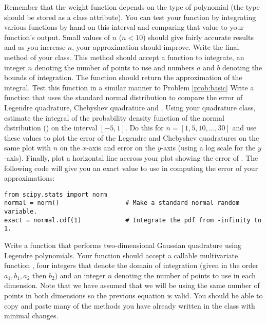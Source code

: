 Remember that the weight function depends on the type of polynomial (the type should be stored as a class attribute).
You can test your function by integrating various functions by hand on this interval and comparing that value to your function's output.
Small values of $n$ ($n<10$) should give fairly accurate results and as you increase $n$, your approximation should improve.
\label{prob:basic}
Write the final method of your class.
This method should accept a function  to integrate, an integer $n$ denoting the number of points to use and numbers $a$ and $b$ denoting the bounds of integration.
The function should return the approximation of the integral.
Test this function in a similar manner to Problem \ref{prob:basic}
Write a function that uses the standard normal distribution to compare the error of Legendre quadrature, Chebyshev quadrature and .
Using your quadrature class, estimate the integral of the probability density function of the normal distribution () on the interval $[-5,1]$.
Do this for $n=[1,5,10,\dots,30]$ and use these values to plot the error of the Legendre and Chebyshev quadratures on the same plot with $n$ on the $x$-axis and error on the $y$-axis 
(using a log scale for the $y$-axis).
Finally, plot a horizontal line accross your plot showing the error of .
The following code will give you an exact value to use in computing the error of your approximations:

\begin{lstlisting}
from scipy.stats import norm
normal = norm()                  # Make a standard normal random variable.
exact = normal.cdf(1)            # Integrate the pdf from -infinity to 1.
\end{lstlisting}

Write a function that performs two-dimensional Gaussian quadrature using Legendre polynomials.
Your function should accept a callable multivariate function , four integers that denote the domain of integration (given in the order $a_1, b_1, a_2$ then $b_2$) and an integer $n$ denoting the number 
of points to use in each dimension.
Note that we have assumed that we will be using the same number of points in both dimensions so the previous equation is valid.
You should be able to copy and paste many of the methods you have already written in the  class with minimal changes.

